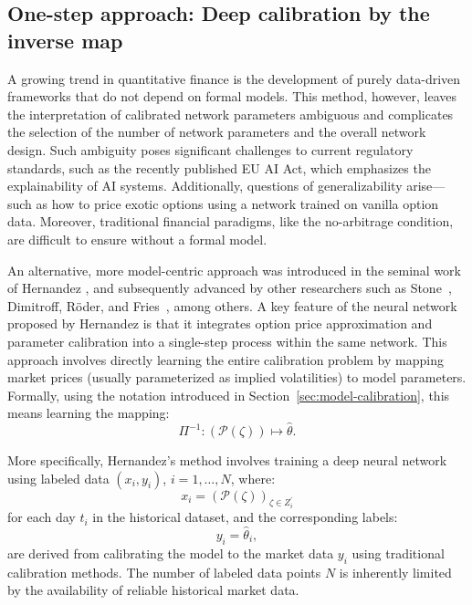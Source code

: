 \documentclass{article}
\theoremstyle{remark}
\begin{document}
\subsection{One-step approach: Deep calibration by the inverse map}
\label{sec:hernandez}
A growing trend in quantitative finance is the development of purely data-driven frameworks that do not depend on formal models.
This method, however, leaves the interpretation of calibrated network parameters ambiguous
and complicates the selection of the number of network parameters and the overall network design.
Such ambiguity poses significant challenges to current regulatory standards,
such as the recently published EU AI Act, which emphasizes the explainability of AI systems.
Additionally, questions of generalizability arise—such as how to price exotic options
using a network trained on vanilla option data. Moreover, traditional financial paradigms,
like the no-arbitrage condition, are difficult to ensure without a formal model.

An alternative, more model-centric approach was introduced in the seminal work of Hernandez \cite{Hernandez},
and subsequently advanced by other researchers such as Stone~\cite{Stone},
Dimitroff, Röder, and Fries~\cite{HestonConvolutional}, among others.
A key feature of the neural network proposed by Hernandez is that it
integrates option price approximation and parameter calibration into a single-step process within the same network.
This approach involves directly learning the entire calibration problem
by mapping market prices (usually parameterized as implied volatilities) to model parameters.
Formally, using the notation introduced in Section~\ref{sec:model-calibration}, this means learning the mapping:
\begin{equation*}
\Pi^{-1}: \left( \mathcal{P}(\zeta) \right) \mapsto \widehat{\theta}.
\end{equation*}

More specifically, Hernandez's method involves training a deep neural network using labeled data $(x_i, y_i)$, $i = 1, \ldots, N$, where:
\begin{equation*}
x_i = \left( \mathcal{P}(\zeta) \right)_{\zeta \in Z^\prime_i}
\end{equation*}
for each day $t_i$ in the historical dataset, and the corresponding labels:
\begin{equation*}
y_i = \widehat{\theta}_i,
\end{equation*}
are derived from calibrating the model to the market data $y_i$ using traditional calibration methods. The number of labeled data points $N$ is inherently limited by the availability of reliable historical market data.
\end{document}
